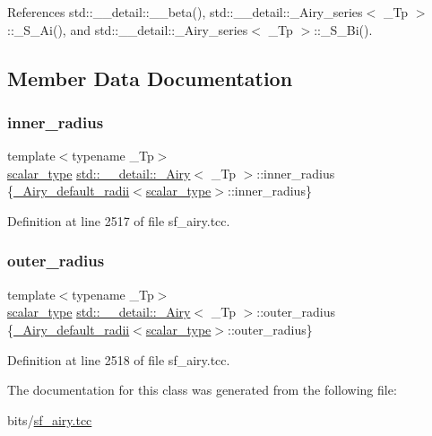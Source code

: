 References std\+::\+\_\+\+\_\+detail\+::\+\_\+\+\_\+beta(), std\+::\+\_\+\+\_\+detail\+::\+\_\+\+Airy\+\_\+series$<$ \+\_\+\+Tp $>$\+::\+\_\+\+S\+\_\+\+Ai(), and std\+::\+\_\+\+\_\+detail\+::\+\_\+\+Airy\+\_\+series$<$ \+\_\+\+Tp $>$\+::\+\_\+\+S\+\_\+\+Bi().



\subsection{Member Data Documentation}
\mbox{\label{classstd_1_1____detail_1_1__Airy_ae619970f4c54b7f80340f05b7ead83e1}} 
\subsubsection{\texorpdfstring{inner\+\_\+radius}{inner\_radius}}
{\footnotesize\ttfamily template$<$typename \+\_\+\+Tp$>$ \\
\hyperlink{classstd_1_1____detail_1_1__Airy_a4b2b920ead7adcf08d49420c24e491b5}{scalar\+\_\+type} \hyperlink{classstd_1_1____detail_1_1__Airy}{std\+::\+\_\+\+\_\+detail\+::\+\_\+\+Airy}$<$ \+\_\+\+Tp $>$\+::inner\+\_\+radius \{\hyperlink{structstd_1_1____detail_1_1__Airy__default__radii}{\+\_\+\+Airy\+\_\+default\+\_\+radii}$<$\hyperlink{classstd_1_1____detail_1_1__Airy_a4b2b920ead7adcf08d49420c24e491b5}{scalar\+\_\+type}$>$\+::inner\+\_\+radius\}}



Definition at line 2517 of file sf\+\_\+airy.\+tcc.

\mbox{\label{classstd_1_1____detail_1_1__Airy_af688e5d14ed305f95f0e9d9d58d3bf9a}} 
\subsubsection{\texorpdfstring{outer\+\_\+radius}{outer\_radius}}
{\footnotesize\ttfamily template$<$typename \+\_\+\+Tp$>$ \\
\hyperlink{classstd_1_1____detail_1_1__Airy_a4b2b920ead7adcf08d49420c24e491b5}{scalar\+\_\+type} \hyperlink{classstd_1_1____detail_1_1__Airy}{std\+::\+\_\+\+\_\+detail\+::\+\_\+\+Airy}$<$ \+\_\+\+Tp $>$\+::outer\+\_\+radius \{\hyperlink{structstd_1_1____detail_1_1__Airy__default__radii}{\+\_\+\+Airy\+\_\+default\+\_\+radii}$<$\hyperlink{classstd_1_1____detail_1_1__Airy_a4b2b920ead7adcf08d49420c24e491b5}{scalar\+\_\+type}$>$\+::outer\+\_\+radius\}}



Definition at line 2518 of file sf\+\_\+airy.\+tcc.



The documentation for this class was generated from the following file\+:\begin{DoxyCompactItemize}
\item 
bits/\hyperlink{sf__airy_8tcc}{sf\+\_\+airy.\+tcc}\end{DoxyCompactItemize}
